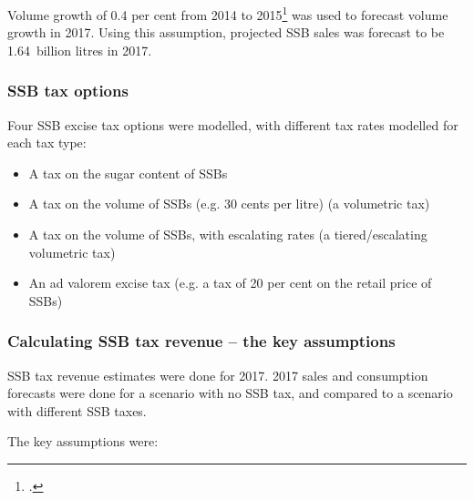 \documentclass[embargoed]{grattan}
\begin{document}
Volume growth of 0.4 per cent from 2014 to 2015\footcite{Media2015RetailWorldAnnual} was used to forecast volume growth in 2017.
Using this assumption, projected SSB sales was forecast to be 1.64~billion litres in 2017.

\subsubsection{SSB tax options}\label{ssb-tax-options}

Four SSB excise tax options were modelled, with different tax rates modelled for each tax type:

\begin{itemize}
\item
  A tax on the sugar content of SSBs
\item
  A tax on the volume of SSBs (e.g. 30 cents per litre) (a volumetric tax)
\item
  A tax on the volume of SSBs, with escalating rates (a tiered/escalating volumetric tax)
\item
  An ad valorem excise tax (e.g. a tax of 20 per cent on the retail price of SSBs)
\end{itemize}

\subsubsection{Calculating SSB tax revenue -- the key assumptions }\label{calculating-ssb-tax-revenue-the-key-assumptions}

SSB tax revenue estimates were done for 2017. 2017 sales and consumption forecasts were done for a scenario with no SSB tax, and compared to a scenario with different SSB taxes.

The key assumptions were:
\end{document}
